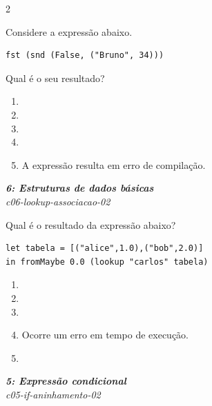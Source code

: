 \documentclass[a4paper,10pt,brazil]{article}
\begin{document}
\begin{multicols}{2}
\begin{flushright}
\end{flushright}
Considere a expressão abaixo.
\begin{verbatim}
fst (snd (False, ("Bruno", 34)))
\end{verbatim}
Qual é o seu resultado?

\begin{enumerate}
  \item {}

  \item {}

  \item {}

  \item {}

  \item A expressão resulta em erro de compilação.


\end{enumerate}

\begin{flushright}
  \footnotesize
  \textit{\textbf{6: Estruturas de dados básicas}}\\
  \textit{c06-lookup-associacao-02}\\

\end{flushright}
Qual é o resultado da expressão abaixo?
\begin{verbatim}
let tabela = [("alice",1.0),("bob",2.0)]
in fromMaybe 0.0 (lookup "carlos" tabela)
\end{verbatim}

\begin{enumerate}
  \item {}

  \item {}

  \item {}

  \item Ocorre um erro em tempo de execução.

  \item {}


\end{enumerate}

\begin{flushright}
  \footnotesize
  \textit{\textbf{5: Expressão condicional}}\\
  \textit{c05-if-aninhamento-02}\\


\end{flushright}
\end{multicols}
\end{document}
